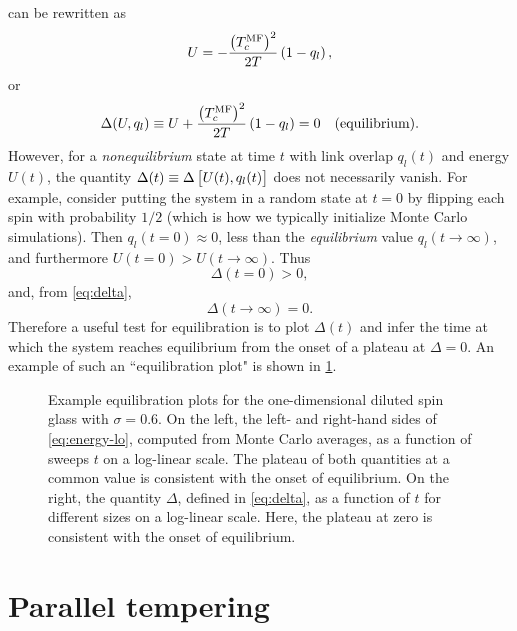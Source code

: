  can be rewritten as
\begin{equation}
  U = - \frac{\left(T_c^{\mathrm{MF}}\right)^2}{2T} \left(1 - q_l\right),
  \label{eq:energy-lo}
\end{equation}
or
\begin{equation}
  \Delta(U,q_l) \equiv
  U + \frac{\left(T_c^{\mathrm{MF}}\right)^2}{2T} \left(1 - q_l\right) = 0
  \quad\text{(equilibrium).}
  \label{eq:delta}
\end{equation}
However, for a \emph{nonequilibrium} state at time $t$ with link overlap
$q_l(t)$ and energy $U(t)$, the quantity $\Delta(t) \equiv
\Delta\left[U(t),q_l(t)\right]$ does not necessarily vanish. For example, consider
putting the system in a random state at $t=0$ by flipping each spin with
probability $1/2$ (which is how we typically initialize Monte Carlo
simulations). Then $q_l(t=0) \approx 0$, less than the \emph{equilibrium} value
$q_l(t \to \infty)$, and furthermore $U(t=0) > U(t \to \infty)$. Thus
\begin{equation}
  \Delta(t=0) > 0,
\end{equation}
and, from \cref{eq:delta},
\begin{equation}
  \Delta(t \to \infty) = 0.
\end{equation}
Therefore a useful test for equilibration is to plot $\Delta(t)$ and infer the
time at which the system reaches equilibrium from the onset of a plateau at
$\Delta=0$. An example of such an ``equilibration plot" is shown in
\cref{fig:equil}.


\begin{figure}
  \centering
  
  
  \caption[%
    Example equilibration plots for a spin glass model with Gaussian couplings.
  ]
  {%
    Example equilibration plots for the one-dimensional diluted spin glass with
    $\sigma=0.6$. On the left, the left- and right-hand sides of
    \cref{eq:energy-lo}, computed from Monte Carlo averages, as a function of
    sweeps $t$ on a log-linear scale. The plateau of both quantities at a
    common value is consistent with the onset of equilibrium. On the right, the
    quantity $\Delta$, defined in \cref{eq:delta}, as a function of $t$ for
    different sizes on a log-linear scale. Here, the plateau at zero is
    consistent with the onset of equilibrium.
  }
  \label{fig:equil}
\end{figure}

\section{Parallel tempering}
\label{sec:numerical-parallel-tempering}

